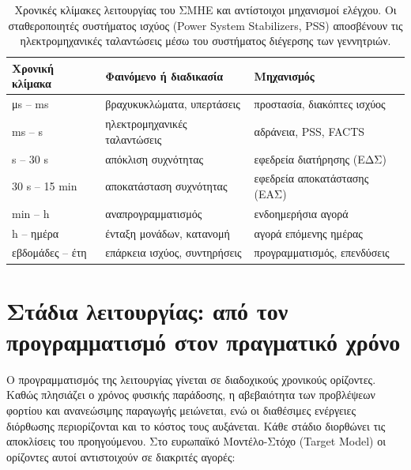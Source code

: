 \begin{table}[!htbp]
\centering
\begin{tabular}{lll}
\hline
Χρονική κλίμακα & Φαινόμενο ή διαδικασία & Μηχανισμός \\
\hline
μs -- ms   & βραχυκυκλώματα, υπερτάσεις   & προστασία, διακόπτες ισχύος \\
ms -- s    & ηλεκτρομηχανικές ταλαντώσεις & αδράνεια, PSS, FACTS \\
s -- 30 s  & απόκλιση συχνότητας          & εφεδρεία διατήρησης (ΕΔΣ) \\
30 s -- 15 min & αποκατάσταση συχνότητας  & εφεδρεία αποκατάστασης (ΕΑΣ) \\
min -- h   & αναπρογραμματισμός           & ενδοημερήσια αγορά \\
h -- ημέρα & ένταξη μονάδων, κατανομή     & αγορά επόμενης ημέρας \\
εβδομάδες -- έτη & επάρκεια ισχύος, συντηρήσεις & προγραμματισμός, επενδύσεις \\
\hline
\end{tabular}
\caption{Χρονικές κλίμακες λειτουργίας του ΣΜΗΕ και αντίστοιχοι μηχανισμοί ελέγχου. Οι
σταθεροποιητές συστήματος ισχύος (Power System Stabilizers, PSS) αποσβένουν τις
ηλεκτρομηχανικές ταλαντώσεις μέσω του συστήματος διέγερσης των γεννητριών.}
\label{tab:chronikes-klimakes}
\end{table}

\section{Στάδια λειτουργίας: από τον προγραμματισμό στον πραγματικό χρόνο}
\label{sec:stages}

Ο προγραμματισμός της λειτουργίας γίνεται σε διαδοχικούς χρονικούς ορίζοντες. Καθώς
πλησιάζει ο χρόνος φυσικής παράδοσης, η αβεβαιότητα των προβλέψεων φορτίου και ανανεώσιμης
παραγωγής μειώνεται, ενώ οι διαθέσιμες ενέργειες διόρθωσης περιορίζονται και το κόστος τους
αυξάνεται. Κάθε στάδιο διορθώνει τις αποκλίσεις του προηγούμενου. Στο ευρωπαϊκό
Μοντέλο-Στόχο (Target Model) οι ορίζοντες αυτοί αντιστοιχούν σε διακριτές αγορές:

